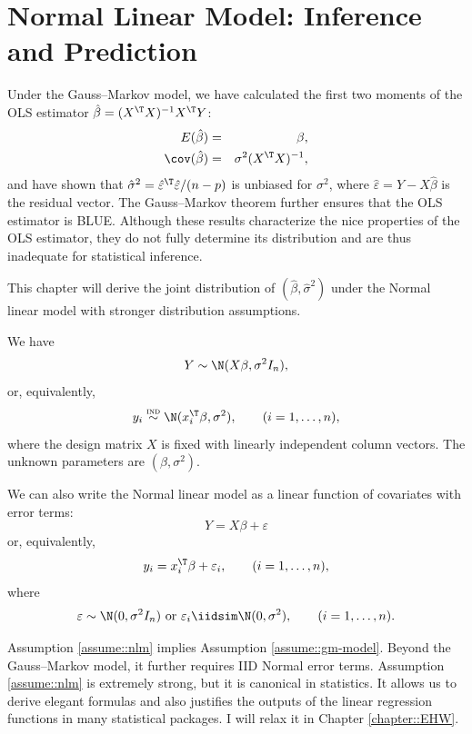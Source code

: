  
\chapter{Normal Linear Model: Inference and Prediction}
 \label{chapter::normal-linear-model}


Under the Gauss--Markov model, we have calculated the first two moments of the OLS estimator $\hat{\beta} = (X^{\T} X)^{-1} X^{\T} Y$:
\begin{eqnarray*}
E(\hat{\beta}) &=& \beta,\\
\cov(\hat{\beta}) &=& \sigma^{2}(X^{\T}X)^{-1},
\end{eqnarray*}
and have shown that $\hat{\sigma}^{2} =   \hat{\varepsilon}^{\T}  \hat{\varepsilon} / (n-p)$ is unbiased for $\sigma^{2}$, where $\hat{\varepsilon} = Y - X \hat{\beta}$ is the residual vector. The Gauss--Markov theorem further ensures that the OLS estimator is BLUE. 
Although these results characterize the nice properties of the OLS estimator,
they do not fully determine its distribution and are thus inadequate
for statistical inference.

 This chapter will derive the joint distribution
of $(\hat{\beta},\hat{\sigma}^{2})$ under the Normal linear model with stronger distribution assumptions. 

 

\begin{assumption}
\label{assume::nlm}
We have
$$
Y\sim\N(X\beta,\sigma^{2}I_{n}) , 
$$
or, equivalently,
$$
y_{i} \stackrel{ \textsc{ind} }{ \sim}\N(x_{i}^{\T}\beta,\sigma^{2}),\qquad(i=1,\ldots,n),
$$ 
where the design matrix $X$ is fixed with linearly independent column vectors. The unknown parameters are $(\beta,\sigma^{2})$. 
\end{assumption}

We can also write the Normal linear model as a linear function of covariates with error terms:
$$
Y = X\beta +\varepsilon 
$$
or, equivalently, 
$$
y_i = x_{i}^{\T}\beta  +\varepsilon_i,\qquad(i=1,\ldots,n),
$$
where 
$$
\varepsilon \sim \N(0,\sigma^2 I_n) \text{ or } \varepsilon_i \iidsim \N(0,\sigma^2), \qquad(i=1,\ldots,n). 
$$ 


Assumption \ref{assume::nlm} implies Assumption \ref{assume::gm-model}. Beyond the Gauss--Markov model, it further requires IID Normal error terms. 
Assumption \ref{assume::nlm} is extremely strong, but it is canonical in statistics. It allows us to derive elegant formulas and also justifies the outputs of the linear regression functions in many statistical packages. I will relax it in Chapter \ref{chapter::EHW}. 



